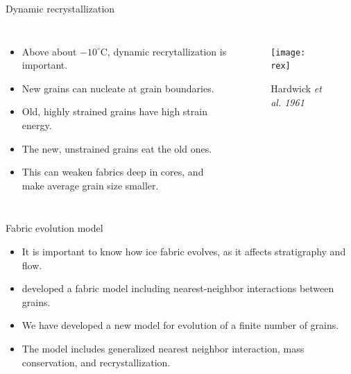 \documentclass{beamer}
\begin{document}
\begin{frame}{Dynamic recrystallization} 
   \begin{columns}[T]
      \begin{itemize}
         \item Above about $-10^{\circ}$C, dynamic recrytallization is important.
         \item New grains can nucleate at grain boundaries.
         \item Old, highly strained grains have high strain energy.
         \item The new, unstrained grains eat the old ones.
         \item This can weaken fabrics deep in cores, and make average grain size smaller.
      \end{itemize}
            \begin{figure}
               \texttt{[image: rex]}
               \caption{Hardwick \it{et al.} 1961}
            \end{figure}
         \end{columns}


\end{frame}


     
 

\begin{frame}{Fabric evolution model}
\begin{itemize}
   \item It is important to know how ice fabric evolves, as it affects stratigraphy and flow.
     \item \citet{thorsteinsson2002nni} developed a fabric model including nearest-neighbor interactions between grains.
      \item We have developed a new model for evolution of a finite number of grains.
      \item The model includes generalized nearest neighbor interaction, mass conservation, and recrystallization.
   \end{itemize}
\end{frame}
\end{document}
